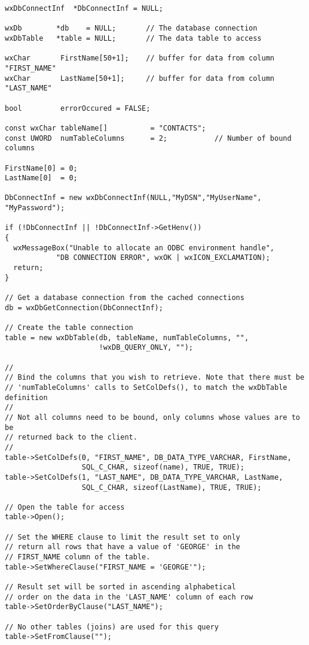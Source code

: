 \begin{verbatim}
wxDbConnectInf  *DbConnectInf = NULL;

wxDb        *db    = NULL;       // The database connection
wxDbTable   *table = NULL;       // The data table to access

wxChar       FirstName[50+1];    // buffer for data from column "FIRST_NAME"
wxChar       LastName[50+1];     // buffer for data from column "LAST_NAME"

bool         errorOccured = FALSE;

const wxChar tableName[]          = "CONTACTS";
const UWORD  numTableColumns      = 2;           // Number of bound columns

FirstName[0] = 0;
LastName[0]  = 0;

DbConnectInf = new wxDbConnectInf(NULL,"MyDSN","MyUserName", "MyPassword");

if (!DbConnectInf || !DbConnectInf->GetHenv())
{
  wxMessageBox("Unable to allocate an ODBC environment handle",
            "DB CONNECTION ERROR", wxOK | wxICON_EXCLAMATION);
  return;
} 

// Get a database connection from the cached connections
db = wxDbGetConnection(DbConnectInf);

// Create the table connection
table = new wxDbTable(db, tableName, numTableColumns, "", 
                      !wxDB_QUERY_ONLY, "");

//
// Bind the columns that you wish to retrieve. Note that there must be
// 'numTableColumns' calls to SetColDefs(), to match the wxDbTable definition
//
// Not all columns need to be bound, only columns whose values are to be 
// returned back to the client.
//
table->SetColDefs(0, "FIRST_NAME", DB_DATA_TYPE_VARCHAR, FirstName,
                  SQL_C_CHAR, sizeof(name), TRUE, TRUE);
table->SetColDefs(1, "LAST_NAME", DB_DATA_TYPE_VARCHAR, LastName,
                  SQL_C_CHAR, sizeof(LastName), TRUE, TRUE);

// Open the table for access
table->Open();

// Set the WHERE clause to limit the result set to only
// return all rows that have a value of 'GEORGE' in the
// FIRST_NAME column of the table.
table->SetWhereClause("FIRST_NAME = 'GEORGE'");

// Result set will be sorted in ascending alphabetical 
// order on the data in the 'LAST_NAME' column of each row
table->SetOrderByClause("LAST_NAME");

// No other tables (joins) are used for this query
table->SetFromClause("");


\end{verbatim}
